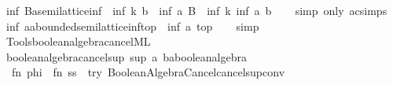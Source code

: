 \begin{isabellebody}
{\isafoldproof}%
%
\isadelimproof
\isanewline
%
\endisadelimproof
\isanewline
{}\isamarkupfalse%
\ inf{}{\isacharcolon}{\kern0pt}\ {\isachardoublequoteopen}{\isacharparenleft}{\kern0pt}B{\isacharcolon}{\kern0pt}{\isacharcolon}{\kern0pt}{\isacharprime}{\kern0pt}a{\isacharcolon}{\kern0pt}{\isacharcolon}{\kern0pt}semilattice{\isacharunderscore}{\kern0pt}inf{\isacharparenright}{\kern0pt}\ {\isasymequiv}\ inf\ k\ b\ {\isasymLongrightarrow}\ inf\ a\ B\ {\isasymequiv}\ inf\ k\ {\isacharparenleft}{\kern0pt}inf\ a\ b{\isacharparenright}{\kern0pt}{\isachardoublequoteclose}\isanewline
%
\isadelimproof
\ \ %
\endisadelimproof
%
\isatagproof
{}\isamarkupfalse%
\ {\isacharparenleft}{\kern0pt}simp\ only{\isacharcolon}{\kern0pt}\ ac{\isacharunderscore}{\kern0pt}simps{\isacharparenright}{\kern0pt}%
\endisatagproof
{\isafoldproof}%
%
\isadelimproof
\isanewline
%
\endisadelimproof
\isanewline
{}\isamarkupfalse%
\ inf{}{\isacharcolon}{\kern0pt}\ {\isachardoublequoteopen}{\isacharparenleft}{\kern0pt}a{\isacharcolon}{\kern0pt}{\isacharcolon}{\kern0pt}{\isacharprime}{\kern0pt}a{\isacharcolon}{\kern0pt}{\isacharcolon}{\kern0pt}bounded{\isacharunderscore}{\kern0pt}semilattice{\isacharunderscore}{\kern0pt}inf{\isacharunderscore}{\kern0pt}top{\isacharparenright}{\kern0pt}\ {\isasymequiv}\ inf\ a\ top{\isachardoublequoteclose}\isanewline
%
\isadelimproof
\ \ %
\endisadelimproof
%
\isatagproof
{}\isamarkupfalse%
\ simp%
\endisatagproof
{\isafoldproof}%
%
\isadelimproof
\isanewline
%
\endisadelimproof
\isanewline
{}\isamarkupfalse%
\isanewline
%
\isadelimML
\isanewline
%
\endisadelimML
%
\isatagML
{}\isamarkupfalse%
\ {\isacartoucheopen}Tools{\isacharslash}{\kern0pt}boolean{\isacharunderscore}{\kern0pt}algebra{\isacharunderscore}{\kern0pt}cancel{\isachardot}{\kern0pt}ML{\isacartoucheclose}\isanewline
\isanewline
{}\isamarkupfalse%
\ boolean{\isacharunderscore}{\kern0pt}algebra{\isacharunderscore}{\kern0pt}cancel{\isacharunderscore}{\kern0pt}sup\ {\isacharparenleft}{\kern0pt}{\isachardoublequoteopen}sup\ a\ b{\isacharcolon}{\kern0pt}{\isacharcolon}{\kern0pt}{\isacharprime}{\kern0pt}a{\isacharcolon}{\kern0pt}{\isacharcolon}{\kern0pt}boolean{\isacharunderscore}{\kern0pt}algebra{\isachardoublequoteclose}{\isacharparenright}{\kern0pt}\ {\isacharequal}{\kern0pt}\isanewline
\ \ {\isacartoucheopen}fn\ phi\ {\isacharequal}{\kern0pt}{\isachargreater}{\kern0pt}\ fn\ ss\ {\isacharequal}{\kern0pt}{\isachargreater}{\kern0pt}\ try\ Boolean{\isacharunderscore}{\kern0pt}Algebra{\isacharunderscore}{\kern0pt}Cancel{\isachardot}{\kern0pt}cancel{\isacharunderscore}{\kern0pt}sup{\isacharunderscore}{\kern0pt}conv{\isacartoucheclose}\isanewline

\end{isabellebody}
